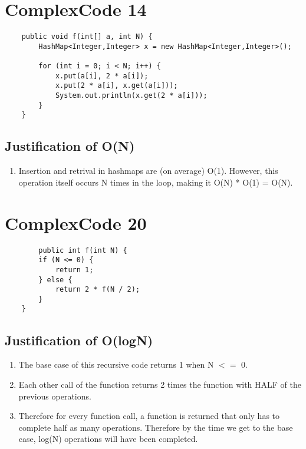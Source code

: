 \documentclass[11pt]{article}
\begin{document}
\section{ComplexCode 14}
  \begin{lstlisting}
   	public void f(int[] a, int N) {
  		HashMap<Integer,Integer> x = new HashMap<Integer,Integer>();
  		
  		for (int i = 0; i < N; i++) {
  			x.put(a[i], 2 * a[i]);
  			x.put(2 * a[i], x.get(a[i]));
  			System.out.println(x.get(2 * a[i]));
  		}
  	}
  \end{lstlisting}

  \subsection{Justification of O(N)}
    \begin{enumerate}
      \item Insertion and retrival in hashmaps are (on average) O(1). However, this operation itself occurs N times in the loop, making it O(N) * O(1) = O(N).
    \end{enumerate}

\section{ComplexCode 20}
  \begin{lstlisting}
    	public int f(int N) {
  		if (N <= 0) {
  			return 1;
  		} else {
  			return 2 * f(N / 2);
  		}
  	}
  \end{lstlisting}

  \subsection{Justification of O(logN)}
    \begin{enumerate}
      \item The base case of this recursive code returns 1 when N $<=$ 0.
      \item Each other call of the function returns 2 times the function with HALF of the previous operations.
      \item Therefore for every function call, a function is returned that only has to complete half as many operations. Therefore by the time we get to the base case, log(N) operations will have been completed. 
    \end{enumerate}
\end{document}
